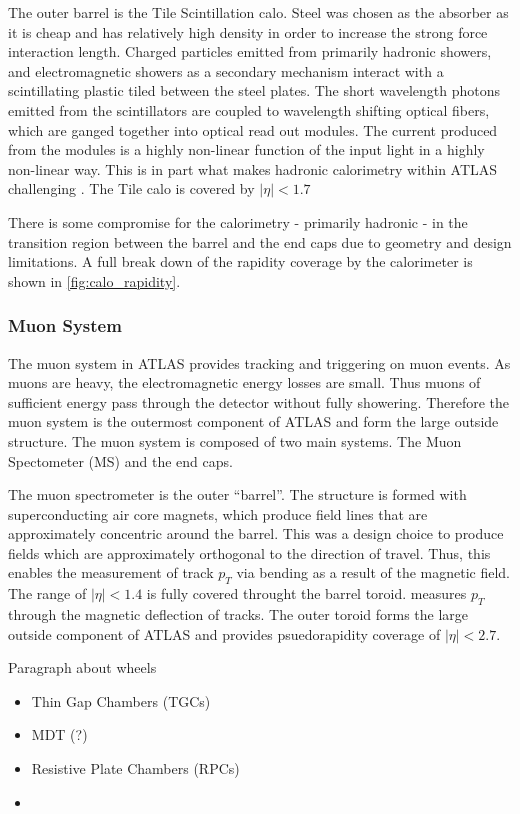 \documentclass[12pt]{article}
\begin{document}
The outer barrel is the Tile Scintillation calo. Steel was chosen as the
absorber as it is cheap and has relatively high density in order to increase the
strong force interaction length. Charged particles emitted from primarily
hadronic showers, and electromagnetic showers as a secondary mechanism interact
with a scintillating plastic tiled between the steel plates. The short
wavelength photons emitted from the scintillators are coupled to wavelength
shifting optical fibers, which are ganged together into optical read out
modules. The current produced from the modules is a highly non-linear function
of the input light in a highly non-linear way. This is in part what makes
hadronic calorimetry within ATLAS challenging
\cite{The_ATLAS_Collaboration_2008}\cite{ml4p}. The Tile calo is covered by
$|\eta|<1.7$

There is some compromise for the calorimetry - primarily hadronic - in the
transition region between the barrel and the end caps due to geometry and design
limitations. A full break down of the rapidity coverage by the calorimeter is
shown in \ref{fig:calo_rapidity}.

\subsubsection{Muon System}

The muon system in ATLAS provides tracking and triggering on muon events. As
muons are heavy, the electromagnetic energy losses are small. Thus muons of
sufficient energy pass through the detector without fully showering. Therefore
the muon system is the outermost component of ATLAS and form the large outside
structure. The muon system is composed of two main systems. The Muon Spectometer
(MS) and the end caps. 

The muon spectrometer is the outer ``barrel''. The structure is formed with
superconducting air core magnets, which produce field lines that are
approximately concentric around the barrel. This was a design choice to produce
fields which are approximately orthogonal to the direction of travel. Thus, this
enables the measurement of track $p_T$ via bending as a result of the magnetic
field. The range of $|\eta|<1.4$ is fully covered throught the barrel toroid.
measures $p_T$ through the magnetic deflection of tracks. The outer toroid forms
the large outside component of ATLAS and provides psuedorapidity coverage of
$|\eta|<2.7$.

Paragraph about wheels

\begin{itemize}
    \item Thin Gap Chambers (TGCs)
    \item MDT (?)
    \item Resistive Plate Chambers (RPCs)
    \item 
\end{itemize}
\end{document}
